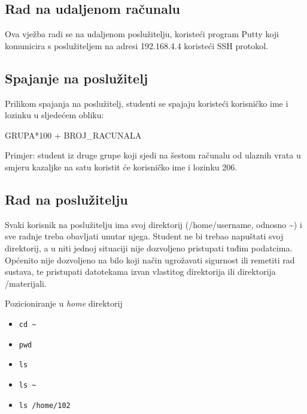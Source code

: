 
\subsection*{Rad na udaljenom računalu}

Ova vježba radi se na udaljenom poslužitelju, koristeći program Putty koji komunicira s poslužiteljem na adresi 192.168.4.4 koristeći SSH protokol.

\subsection*{Spajanje na poslužitelj}
Prilikom spajanja na poslužitelj, studenti se spajaju koristeći korisničko ime i lozinku u sljedećem obliku: 

GRUPA*100 + BROJ\_RACUNALA

Primjer: student iz druge grupe koji sjedi na šestom računalu od ulaznih vrata u smjeru kazaljke na satu koristit će korisničko ime i lozinku 206.


\subsection*{Rad na poslužitelju}
Svaki korisnik na poslužitelju ima svoj direktorij (/home/username, odnosno \textasciitilde) i sve radnje treba obavljati unutar njega. Student ne bi trebao napuštati svoj direktorij, a u niti jednoj situaciji nije dozvoljeno pristupati tuđim podatcima. Općenito nije dozvoljeno na bilo koji način ugrožavati sigurnost ili remetiti rad sustava, te pristupati datotekama izvan vlastitog direktorija ili direktorija /materijali.

\begin{primjer}
	Pozicioniranje u \textit{home} direktorij
	\begin{itemize}
		\item \lstinline!cd ~!
		\item \lstinline!pwd!
		\item \lstinline!ls!
		\item \lstinline!ls ~!
		\item \lstinline!ls /home/102! 
	\end{itemize}
\end{primjer}

